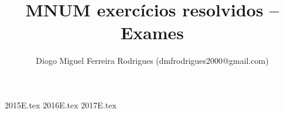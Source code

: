 \documentclass{mnum}
\title{MNUM exercícios resolvidos -- Exames}
\author{Diogo Miguel Ferreira Rodrigues (dmfrodrigues2000@gmail.com)}
\date{}
\begin{document}
\maketitle

\tableofcontents

{2015E.tex}
{2016E.tex}
{2017E.tex}
\end{document}
